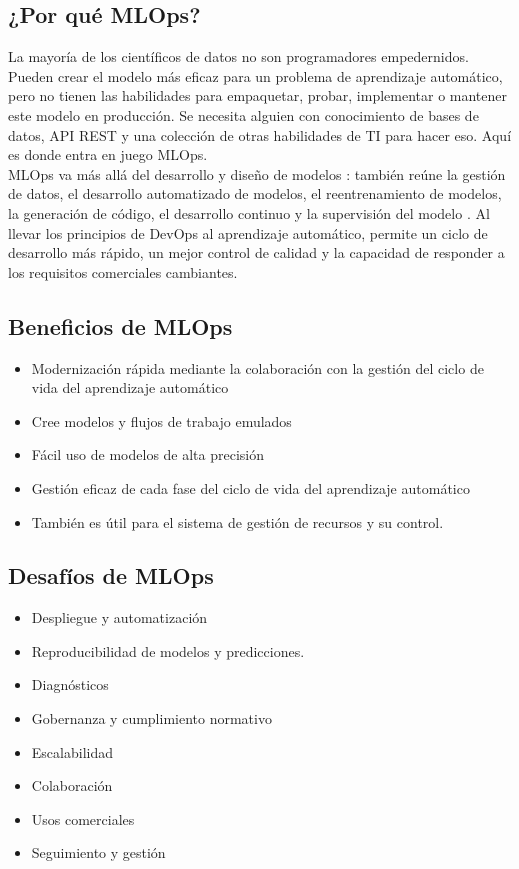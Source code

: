 \documentclass[twoside,twocolumn]{article}
\begin{document}
\subsection{¿Por qué MLOps?}
\noindent La mayoría de los científicos de datos no son programadores empedernidos. Pueden crear el modelo más eficaz para un problema de aprendizaje automático, pero no tienen las habilidades para empaquetar, probar, implementar o mantener este modelo en producción. Se necesita alguien con conocimiento de bases de datos, API REST y una colección de otras habilidades de TI para hacer eso. Aquí es donde entra en juego MLOps.\\[0.1in]
MLOps va más allá del desarrollo y diseño de modelos : también reúne la gestión de datos, el desarrollo automatizado de modelos, el reentrenamiento de modelos, la generación de código, el desarrollo continuo y la supervisión del modelo . Al llevar los principios de DevOps al aprendizaje automático, permite un ciclo de desarrollo más rápido, un mejor control de calidad y la capacidad de responder a los requisitos comerciales cambiantes.

\subsection{Beneficios de MLOps}
\begin{itemize}
    \item Modernización rápida mediante la colaboración con la gestión del ciclo de vida del aprendizaje automático
    \item Cree modelos y flujos de trabajo emulados
    \item Fácil uso de modelos de alta precisión
    \item Gestión eficaz de cada fase del ciclo de vida del aprendizaje automático
    \item También es útil para el sistema de gestión de recursos y su control.    
\end{itemize}

\subsection{Desafíos de MLOps}
\begin{itemize}
    \item Despliegue y automatización
    \item Reproducibilidad de modelos y predicciones.
    \item Diagnósticos
    \item Gobernanza y cumplimiento normativo
    \item Escalabilidad
    \item Colaboración
    \item Usos comerciales
    \item Seguimiento y gestión
\end{itemize}
\end{document}
